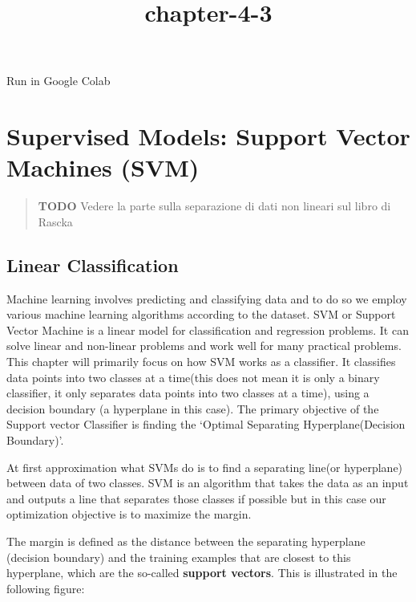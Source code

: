 \documentclass[11pt]{article}
\title{chapter-4-3}
\begin{document}
    
    \maketitle
    
    

    
    Run in Google Colab

    \hypertarget{supervised-models-support-vector-machines-svm}{%
\section{Supervised Models: Support Vector Machines
(SVM)}\label{supervised-models-support-vector-machines-svm}}

    \begin{quote}
\textbf{TODO} Vedere la parte sulla separazione di dati non lineari sul
libro di Rascka
\end{quote}

    \hypertarget{linear-classification}{%
\subsection{Linear Classification}\label{linear-classification}}

    Machine learning involves predicting and classifying data and to do so
we employ various machine learning algorithms according to the dataset.
SVM or Support Vector Machine is a linear model for classification and
regression problems. It can solve linear and non-linear problems and
work well for many practical problems. This chapter will primarily focus
on how SVM works as a classifier. It classifies data points into two
classes at a time(this does not mean it is only a binary classifier, it
only separates data points into two classes at a time), using a decision
boundary (a hyperplane in this case). The primary objective of the
Support vector Classifier is finding the `Optimal Separating
Hyperplane(Decision Boundary)'.

    At first approximation what SVMs do is to find a separating line(or
hyperplane) between data of two classes. SVM is an algorithm that takes
the data as an input and outputs a line that separates those classes if
possible but in this case our optimization objective is to maximize the
margin.

The margin is defined as the distance between the separating hyperplane
(decision boundary) and the training examples that are closest to this
hyperplane, which are the so-called \textbf{support vectors}. This is
illustrated in the following figure:
\end{document}
